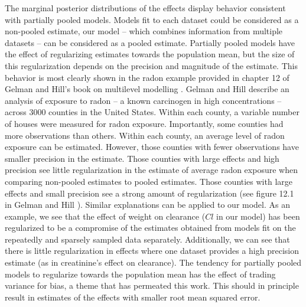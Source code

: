 The marginal posterior distributions of the effects display behavior consistent with partially pooled models.  Models fit to each dataset could be considered as a non-pooled estimate, our model -- which combines information from multiple datasets -- can be considered as a pooled estimate.  Partially pooled models have the effect of regularizing estimates towards the population mean, but the size of this regularization depends on the precision and magnitude of the estimate. This behavior is most clearly shown in the radon example provided in chapter 12 of Gelman and Hill's book on multilevel modelling \cite{gelman2006data}.  Gelman and Hill describe an analysis of exposure to radon -- a known carcinogen in high concentrations -- across 3000 counties in the United States.  Within each county, a variable number of houses were measured for radon exposure.  Importantly, some counties had more observations than others.  Within each county, an average level of radon exposure can be estimated.  However, those counties with fewer observations have smaller precision in the estimate.  Those counties with large effects and high precision see little regularization in the estimate of average radon exposure when comparing non-pooled estimates to pooled estimates.  Those counties with large effects and small precision see a strong amount of regularization (see figure 12.1 in  Gelman and Hill \cite{gelman2006data}). Similar explanations can be applied to our model.  As an example, we see that the effect of weight on clearance ($Cl$ in our model) has been regularized to be a compromise of the estimates obtained from models fit on the repeatedly and sparsely sampled data separately.  Additionally, we can see that there is little regularization in effects where one dataset provides a high precision estimate (as in creatinine's effect on clearance). The tendency for partially pooled models to regularize towards the population mean has the effect of trading variance for bias, a theme that has permeated this work.  This should in principle result in estimates of the effects with smaller root mean squared error.

